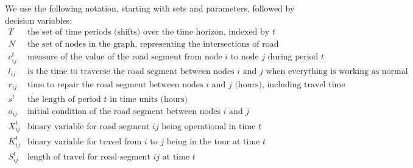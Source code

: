 \documentclass[10pt]{article}
\begin{document}
We use the following notation, starting with sets and parameters, followed by decision variables:
\begin{displaymath}
\begin{array}{ll}
T & \mbox{the set of time periods (shifts) over the time horizon, indexed by $t$}\\
N & \mbox{the set of nodes in the graph, representing the intersections of road segments}\\
c_{ij}^t & \mbox{measure of the value of the road segment from node $i$ to node $j$ during period $t$}\\
l_{ij} & \mbox{is the time to traverse the road segment between nodes $i$ and $j$ when everything is working as normal}\\
r_{ij} & \mbox{time to repair the road segment between nodes $i$ and $j$ (hours), including travel time}\\
s^t & \mbox{the length of period $t$ in time units (hours)}\\
o_{ij} & \mbox{initial condition of the road segment between nodes $i$ and $j$}\\
X_{ij}^t & \mbox{binary variable for road segment $ij$ being operational in time $t$}\\
K_{ij}^t & \mbox{binary variable for travel from $i$ to $j$ being in the tour at time $t$}\\
S_{ij}^t & \mbox{length of travel for road segment $ij$ at time $t$}\\
\end{array}
\end{displaymath}
\end{document}
